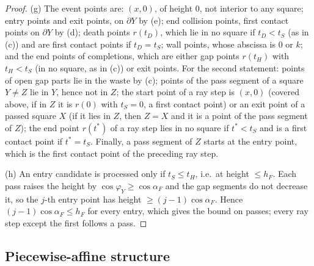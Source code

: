 \documentclass[11pt]{amsart}
\theoremstyle{definition}
\theoremstyle{remark}
\numberwithin{equation}{section}
\begin{document}
\begin{proof}
(g) The event points are: $(x,0)$, of height $0$, not interior to any square; entry points and exit points, on
$\partial Y$ by (e); end collision points, first contact points on $\partial Y$ by (d); death points $r(t_D)$, which lie
in no square if $t_D<t_S$ (as in (c)) and are first contact points if $t_D=t_S$; wall points, whose abscissa is $0$ or
$k$; and the end points of completions, which are either gap points $r(t_H)$ with $t_H<t_S$ (in no square, as in (c))
or exit points. For the second statement: points of open gap parts lie in the waste by (c); points of the pass segment
of a square $Y\ne Z$ lie in $Y$, hence not in $Z$; the start point of a ray step is $(x,0)$ (covered above, if in $Z$ it
is $r(0)$ with $t_S=0$, a first contact point) or an exit point of a passed square $X$ (if it lies in $Z$, then $Z=X$
and it is a point of the pass segment of $Z$); the end point $r(t^*)$ of a ray step lies in no square if $t^*<t_S$ and
is a first contact point if $t^*=t_S$. Finally, a pass segment of $Z$ starts at the entry point, which is the first
contact point of the preceding ray step.

(h) An entry candidate is processed only if $t_S\le t_H$, i.e.\ at height $\le h_F$. Each pass raises the height by
$\cos\varphi_Y\ge\cos\alpha_F$ and the gap segments do not decrease it, so the $j$-th entry point has height
$\ge(j-1)\cos\alpha_F$. Hence $(j-1)\cos\alpha_F\le h_F$ for every entry, which gives the bound on passes; every ray step
except the first follows a pass.
\end{proof}

\subsection{Piecewise-affine structure}\label{ssec:flows-structure}
\end{document}
